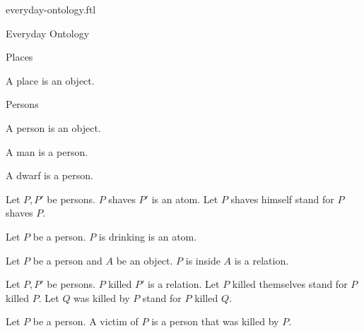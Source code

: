 \documentclass{naproche-library}
\begin{document}
\begin{smodule}{everyday-ontology.ftl}

\begin{sfragment}{Everyday Ontology}
  \begin{sfragment}{Places}
    \begin{signature*}[forthel]
      A place is an object.
    \end{signature*}
  \end{sfragment}

  \begin{sfragment}{Persons}
    \begin{signature*}[forthel]
      A person is an object.
    \end{signature*}

    \begin{signature*}[forthel]
      A man is a person.
    \end{signature*}

    \begin{signature*}[forthel]
      A dwarf is a person.
    \end{signature*}

    \begin{signature*}[forthel]
      Let $P, P'$ be persons.
      $P$ shaves $P'$ is an atom.
      Let $P$ shaves himself stand for $P$ shaves $P$.
    \end{signature*}

    \begin{signature*}[forthel]
      Let $P$ be a person.
      $P$ is drinking is an atom.
    \end{signature*}

    \begin{signature*}[forthel]
      Let $P$ be a person and $A$ be an object.
      $P$ is inside $A$ is a relation.
    \end{signature*}

    \begin{signature*}[forthel]
      Let $P, P'$ be persons.
      $P$ killed $P'$ is a relation.
      Let $P$ killed themselves stand for $P$ killed $P$.
      Let $Q$ was killed by $P$ stand for $P$ killed $Q$.
    \end{signature*}

    \begin{definition*}[forthel]
      Let $P$ be a person.
      A victim of $P$ is a person that was killed by $P$.
    \end{definition*}


\end{sfragment}
\end{sfragment}
\end{smodule}
\end{document}
